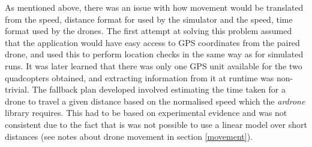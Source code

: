 As mentioned above, there was an issue with how movement would be translated from the {speed, distance} format for used by the simulator and the {speed, time} format used by the drones. The first attempt at solving this problem assumed that the application would have easy access to GPS coordinates from the paired drone, and used this to perform location checks in the same way as for simulated runs. It was later learned that there was only one GPS unit available for the two quadcopters obtained, and extracting information from it at runtime was non-trivial. The fallback plan developed involved estimating the time taken for a drone to travel a given distance based on the normalised speed which the \textit{ardrone} library requires. This had to be based on experimental evidence and was not consistent due to the fact that is was not possible to use a linear model over short distances (see notes about drone movement in section \ref{movement}).

